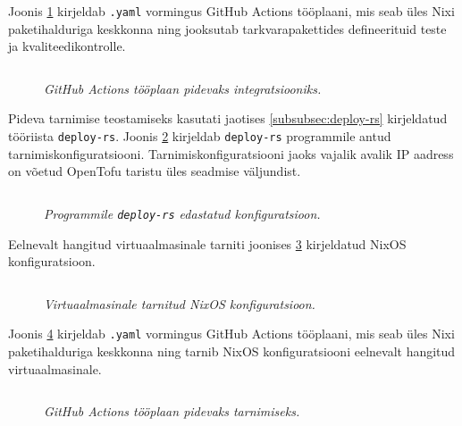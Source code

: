 Joonis \ref{fig:ci-yaml} kirjeldab \texttt{.yaml} vormingus GitHub Actions tööplaani, mis seab üles Nixi paketihalduriga keskkonna ning jooksutab tarkvarapakettides defineerituid teste ja kvaliteedikontrolle.

\begin{figure}
\inputminted[breaklines]{yaml}{chapters/data/ci.yaml}
\caption{\emph{GitHub Actions tööplaan pidevaks integratsiooniks.}}\label{fig:ci-yaml}
\end{figure}

Pideva tarnimise teostamiseks kasutati jaotises \ref{subsubsec:deploy-rs} kirjeldatud tööriista \texttt{deploy-rs}. Joonis \ref{fig:deploy-rs-config} kirjeldab \texttt{deploy-rs} programmile antud tarnimiskonfiguratsiooni. Tarnimiskonfiguratsiooni jaoks vajalik avalik IP aadress on võetud OpenTofu taristu üles seadmise väljundist.

\begin{figure}
\inputminted[breaklines]{nix}{chapters/data/deploys.nix}
\caption{\emph{Programmile \texttt{deploy-rs} edastatud konfiguratsioon.}}\label{fig:deploy-rs-config}
\end{figure}

Eelnevalt hangitud virtuaalmasinale tarniti joonises \ref{fig:ec2-config} kirjeldatud NixOS konfiguratsioon. 

\begin{figure}
\inputminted[breaklines]{nix}{chapters/data/ec2-config.nix}
\caption{\emph{Virtuaalmasinale tarnitud NixOS konfiguratsioon.}}\label{fig:ec2-config}
\end{figure}

Joonis \ref{fig:cd-yaml} kirjeldab \texttt{.yaml} vormingus GitHub Actions tööplaani, mis seab üles Nixi paketihalduriga keskkonna ning tarnib NixOS konfiguratsiooni eelnevalt hangitud virtuaalmasinale.

\begin{figure}
\inputminted[breaklines]{yaml}{chapters/data/cd.yaml}
\caption{\emph{GitHub Actions tööplaan pidevaks tarnimiseks.}}\label{fig:cd-yaml}
\end{figure}

